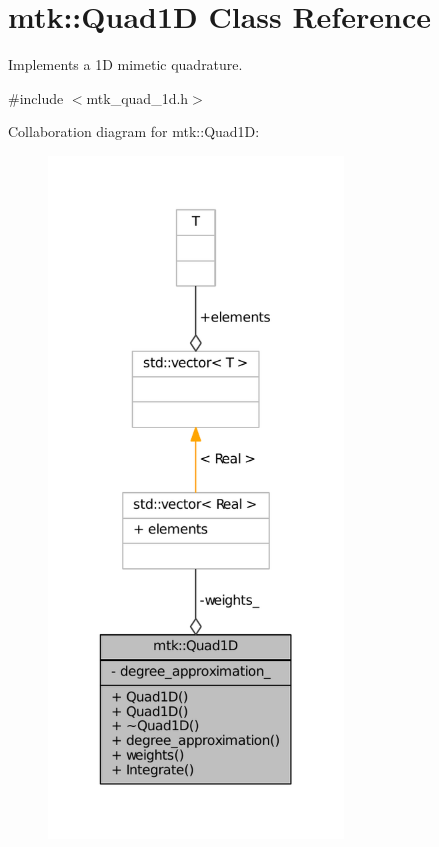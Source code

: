 \hypertarget{classmtk_1_1Quad1D}{\section{mtk\-:\-:Quad1\-D Class Reference}
\label{classmtk_1_1Quad1D}
}


Implements a 1\-D mimetic quadrature.  




{\ttfamily \#include $<$mtk\-\_\-quad\-\_\-1d.\-h$>$}



Collaboration diagram for mtk\-:\-:Quad1\-D\-:
\nopagebreak
\begin{figure}[H]
\begin{center}
\leavevmode
\includegraphics[width=222pt]{classmtk_1_1Quad1D__coll__graph}
\end{center}
\end{figure}
